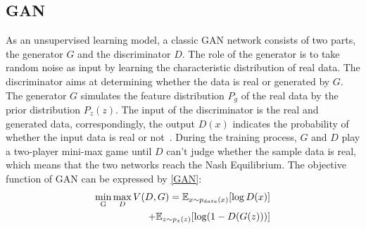 \documentclass[conference]{IEEEtran}
\begin{document}
\subsection{GAN}\label{AA}
As an unsupervised learning model, a classic GAN network consists of two parts, the generator $G$ and the discriminator $D$. %
The role of the generator is to take random noise as input by learning the characteristic distribution of real data. The discriminator aims at determining whether the data is real or generated by $G$.  
The generator $G$ simulates the feature distribution $P_g$ of the real data by the prior distribution $P_z(z)$. The input of the discriminator is the real and generated data, correspondingly, the output $D(x)$ indicates the probability of whether the input data is real or not~\cite{r11}. During the training process, $G$ and $D$ play a two-player mini-max game until $D$ can't judge whether the sample data is real, which means that the two networks reach the Nash Equilibrium. The objective function of GAN can be expressed by \eqref{GAN}:
\begin{equation}
\begin{split}
\label{GAN}
\mathop {\min }\limits_{\rm{G}} \mathop {\max }\limits_D V(D,G) = \mathbb{E}_{x\sim{p_{data}}(x)}[\log D(x)] \\
+ {\mathbb{E}_{z\sim{p_z}(z)}}[\log (1 - D(G(z)))]
\end{split}
\end{equation}

\end{document}
